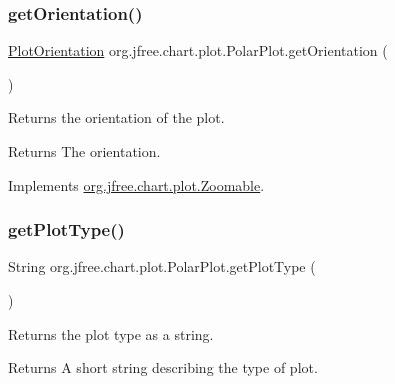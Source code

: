\subsubsection{\texorpdfstring{get\+Orientation()}{getOrientation()}}
{\footnotesize\ttfamily \mbox{\hyperlink{classorg_1_1jfree_1_1chart_1_1plot_1_1_plot_orientation}{Plot\+Orientation}} org.\+jfree.\+chart.\+plot.\+Polar\+Plot.\+get\+Orientation (\begin{DoxyParamCaption}{ }\end{DoxyParamCaption})}

Returns the orientation of the plot.

\begin{DoxyReturn}{Returns}
The orientation. 
\end{DoxyReturn}


Implements \mbox{\hyperlink{interfaceorg_1_1jfree_1_1chart_1_1plot_1_1_zoomable_a293ef8fc796608bde4d44dfbac8dfdda}{org.\+jfree.\+chart.\+plot.\+Zoomable}}.

\mbox{\label{classorg_1_1jfree_1_1chart_1_1plot_1_1_polar_plot_a344dc7b5724b7af8700984f11efe8030}} 
\subsubsection{\texorpdfstring{get\+Plot\+Type()}{getPlotType()}}
{\footnotesize\ttfamily String org.\+jfree.\+chart.\+plot.\+Polar\+Plot.\+get\+Plot\+Type (\begin{DoxyParamCaption}{ }\end{DoxyParamCaption})}

Returns the plot type as a string.

\begin{DoxyReturn}{Returns}
A short string describing the type of plot. 
\end{DoxyReturn}
\mbox{\label{classorg_1_1jfree_1_1chart_1_1plot_1_1_polar_plot_a4589a05cc95f039c6c054f6657f3f659}} 
